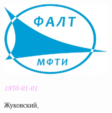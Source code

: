 
\thispagestyle{empty}%
\begin{center}%
  \paperOrganization
\end{center}%
%
\vspace{0pt plus 6fill}%
%
\begin{center}
  \includegraphics[width=15em]{images/falt_logo.jpg}
\end{center}
%
\vspace{0pt plus 4fill}%
%
\begin{center}%
\paperDepartment
\end{center}%
%
\vspace{0pt plus 1fill}%
%
\begin{center}%
\textbf{\Huge\paperTitle}

\vspace{0pt plus 2fill}%
\textit{\large \paperSubject}

\vspace{0pt plus 4fill}%
\textcolor{violet}{\itshape\today}

\vspace{0pt plus 4fill}%
{Жуковский, \paperDate}
\end{center}
